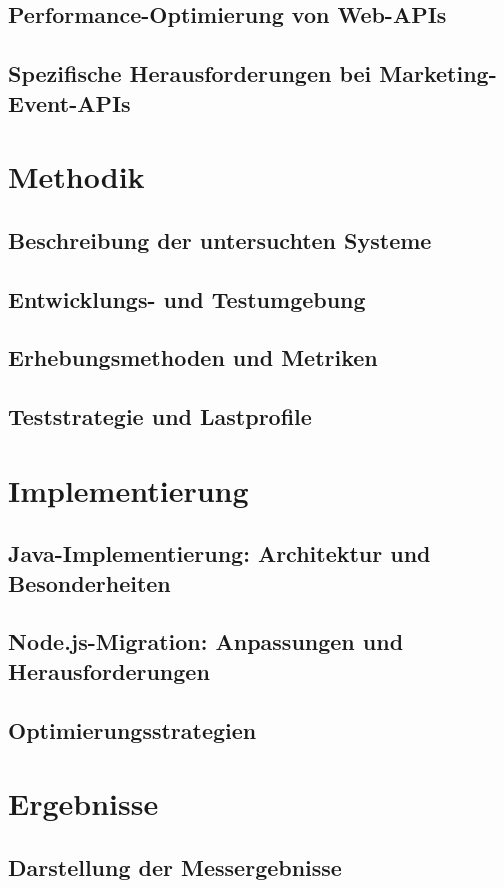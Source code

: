 \documentclass[a4paper, 12pt, oneside]{book}
\begin{document}
\section{Performance-Optimierung von Web-APIs}
\section{Spezifische Herausforderungen bei Marketing-Event-APIs}

\chapter{Methodik}
\section{Beschreibung der untersuchten Systeme}
\section{Entwicklungs- und Testumgebung}
\section{Erhebungsmethoden und Metriken}
\section{Teststrategie und Lastprofile}

\chapter{Implementierung}
\section{Java-Implementierung: Architektur und Besonderheiten}
\section{Node.js-Migration: Anpassungen und Herausforderungen}
\section{Optimierungsstrategien}

\chapter{Ergebnisse}
\section{Darstellung der Messergebnisse}
\end{document}
